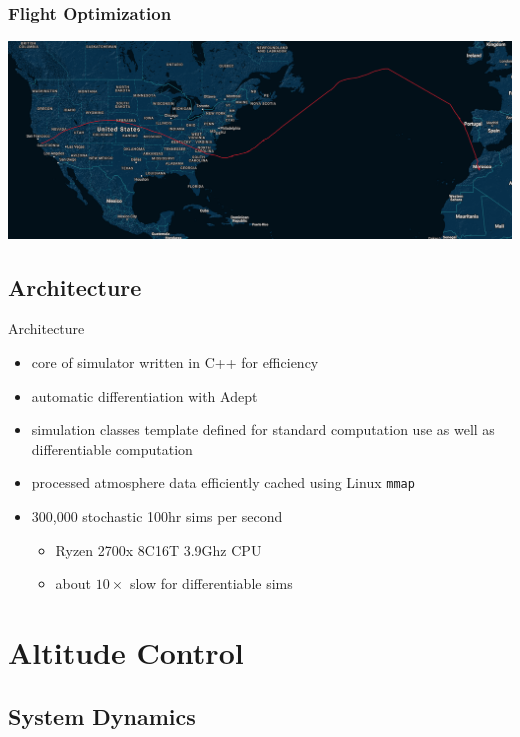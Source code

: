 \documentclass[10pt,mathserif]{beamer}
\begin{document}
\begin{frame}
\frametitle{Flight Optimization}
\begin{center}
\hspace*{-1.4cm}\includegraphics[width=1.2\linewidth,trim={0 0cm 0 0cm},clip]{f8.png}
\end{center}
\end{frame}

\subsection{Architecture}
\begin{frame}{Architecture}
\begin{itemize}\itemsep=12pt
\item core of simulator written in C++ for efficiency
\item automatic differentiation with Adept
\item simulation classes template defined for standard computation use as well as differentiable computation
\item processed atmosphere data efficiently cached using Linux {\tt mmap}
\item 300,000 stochastic 100hr sims per second
\begin{itemize}
\item Ryzen 2700x 8C16T 3.9Ghz CPU
\item about $10\times$ slow for differentiable sims
\end{itemize}
\end{itemize}
\end{frame}

\section{Altitude Control}
\subsection{System Dynamics}
\end{document}
